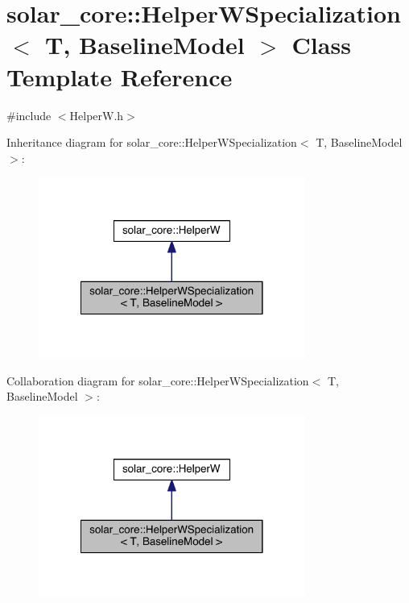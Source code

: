 \hypertarget{classsolar__core_1_1_helper_w_specialization_3_01_t_00_01_baseline_model_01_4}{}\section{solar\+\_\+core\+:\+:Helper\+W\+Specialization$<$ T, Baseline\+Model $>$ Class Template Reference}
\label{classsolar__core_1_1_helper_w_specialization_3_01_t_00_01_baseline_model_01_4}


{\ttfamily \#include $<$Helper\+W.\+h$>$}



Inheritance diagram for solar\+\_\+core\+:\+:Helper\+W\+Specialization$<$ T, Baseline\+Model $>$\+:\nopagebreak
\begin{figure}[H]
\begin{center}
\leavevmode
\includegraphics[width=248pt]{classsolar__core_1_1_helper_w_specialization_3_01_t_00_01_baseline_model_01_4__inherit__graph}
\end{center}
\end{figure}


Collaboration diagram for solar\+\_\+core\+:\+:Helper\+W\+Specialization$<$ T, Baseline\+Model $>$\+:\nopagebreak
\begin{figure}[H]
\begin{center}
\leavevmode
\includegraphics[width=248pt]{classsolar__core_1_1_helper_w_specialization_3_01_t_00_01_baseline_model_01_4__coll__graph}
\end{center}
\end{figure}
